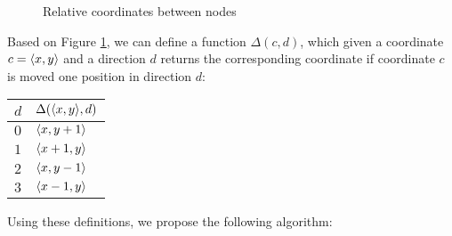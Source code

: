 \begin{figure}[h]
\centering
\begin{nodefigure}
\end{nodefigure}
\caption{\label{fig:relcoords} Relative coordinates between nodes}
\end{figure}

Based on Figure \ref{fig:relcoords}, we can define a function $\Delta(c,d)$, which given a coordinate $c = \langle x,y \rangle$ and a direction $d$ returns the corresponding coordinate if coordinate $c$ is moved one position in direction $d$:

\begin{center}
\begin{tabular}{|l|l|}
\hline
\textbf{$d$} & \textbf{$\Delta(\langle x,y \rangle, d)$} \\
\hline
$0$     & $\langle x,y+1 \rangle$ \\
\hline
$1$     & $\langle x+1,y \rangle$ \\
\hline
$2$     & $\langle x,y-1 \rangle$ \\
\hline
$3$     & $\langle x-1,y \rangle$ \\
\hline
\end{tabular}
\end{center}

Using these definitions, we propose the following algorithm:

